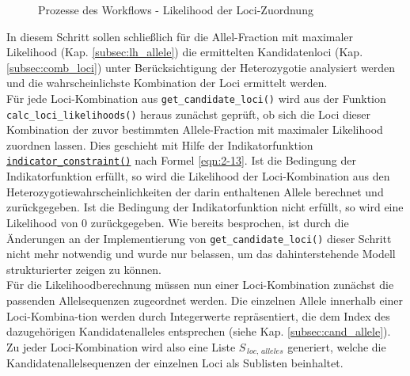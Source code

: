\begin{figure}[h]
\begin{center}
		\caption{Prozesse des Workflows - Likelihood der Loci-Zuordnung \cite{tikz_schema, bootstrap}}
		\label{fig:workflow_all}
	\end{center}
\end{figure}

In diesem Schritt sollen schließlich für die Allel-Fraction mit maximaler Likelihood (Kap. \ref{subsec:lh_allele}) die ermittelten Kandidatenloci (Kap. \ref{subsec:comb_loci}) unter Berücksichtigung der Heterozygotie analysiert werden und die wahrscheinlichste Kombination der Loci ermittelt werden.\\

Für jede Loci-Kombination aus \lstinline|get_candidate_loci()| wird aus der Funktion \linebreak \lstinline|calc_loci_likelihoods()| heraus zunächst geprüft, ob sich die Loci dieser Kombination der zuvor bestimmten Allele-Fraction mit maximaler Likelihood zuordnen lassen. Dies geschieht mit Hilfe der Indikatorfunktion \hyperref[schritt14b]{\lstinline|indicator_constraint()|\label{schritt14btxt}} nach Formel \eqref{eqn:2-13}. Ist die Bedingung der Indikatorfunktion erfüllt, so wird die Likelihood der Loci-Kombination aus den Heterozygotiewahrscheinlichkeiten der darin enthaltenen Allele berechnet und zurückgegeben. Ist die Bedingung der Indikatorfunktion nicht erfüllt, so wird eine Likelihood von 0 zurückgegeben. Wie bereits besprochen, ist durch die Änderungen an der Implementierung von \lstinline|get_candidate_loci()| dieser Schritt nicht mehr notwendig und wurde nur belassen, um das dahinterstehende Modell strukturierter zeigen zu können.\\

Für die Likelihoodberechnung müssen nun einer Loci-Kombination zunächst die passenden Allelsequenzen zugeordnet werden. Die einzelnen Allele innerhalb einer Loci-Kombina-tion werden durch Integerwerte repräsentiert, die dem Index des dazugehörigen Kandidatenalleles entsprechen (siehe Kap. \ref{subsec:cand_allele}). Zu jeder Loci-Kombination wird also eine Liste $ S_{\,loc,\, alleles} $ generiert, welche die Kandidatenallelsequenzen der einzelnen Loci als Sublisten beinhaltet.\\

